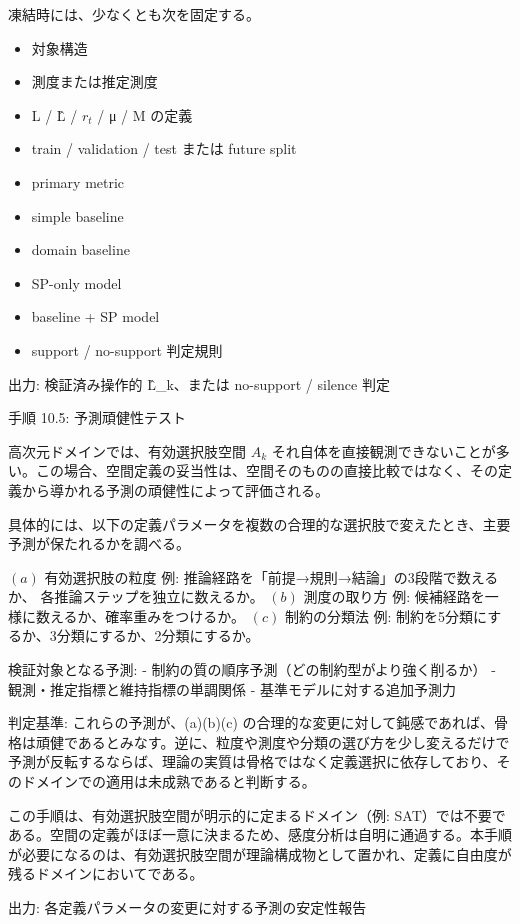 \documentclass[12pt,a4paper]{article}
\begin{document}
凍結時には、少なくとも次を固定する。

\begin{itemize}
\tightlist
\item
  対象構造
\item
  測度または推定測度
\item
  L / L̂ / \(r_{t}\) / μ / M の定義
\item
  train / validation / test または future split
\item
  primary metric
\item
  simple baseline
\item
  domain baseline
\item
  SP-only model
\item
  baseline + SP model
\item
  support / no-support 判定規則
\end{itemize}

出力: 検証済み操作的 L̂\_k、または no-support / silence 判定

手順 10.5: 予測頑健性テスト

高次元ドメインでは、有効選択肢空間 \(A_{k}\) それ自体を直接観測できないことが多い。この場合、空間定義の妥当性は、空間そのものの直接比較ではなく、その定義から導かれる予測の頑健性によって評価される。

具体的には、以下の定義パラメータを複数の合理的な選択肢で変えたとき、主要予測が保たれるかを調べる。

\((a)\) 有効選択肢の粒度 例: 推論経路を「前提→規則→結論」の3段階で数えるか、 各推論ステップを独立に数えるか。 \((b)\) 測度の取り方 例: 候補経路を一様に数えるか、確率重みをつけるか。 \((c)\) 制約の分類法 例: 制約を5分類にするか、3分類にするか、2分類にするか。

検証対象となる予測: - 制約の質の順序予測（どの制約型がより強く削るか） - 観測・推定指標と維持指標の単調関係 - 基準モデルに対する追加予測力

判定基準: これらの予測が、(a)(b)(c) の合理的な変更に対して鈍感であれば、骨格は頑健であるとみなす。逆に、粒度や測度や分類の選び方を少し変えるだけで予測が反転するならば、理論の実質は骨格ではなく定義選択に依存しており、そのドメインでの適用は未成熟であると判断する。

この手順は、有効選択肢空間が明示的に定まるドメイン（例: SAT）では不要である。空間の定義がほぼ一意に決まるため、感度分析は自明に通過する。本手順が必要になるのは、有効選択肢空間が理論構成物として置かれ、定義に自由度が残るドメインにおいてである。

出力: 各定義パラメータの変更に対する予測の安定性報告
\end{document}
